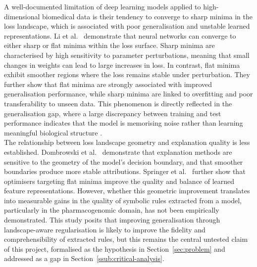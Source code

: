 \label{ssub:sam}

A well-documented limitation of deep learning models applied to high-dimensional biomedical data is
their tendency to converge to sharp minima in the loss landscape, which is associated with poor
generalisation and unstable learned representations. Li et al.~\cite{Li2018} demonstrate that neural
networks can converge to either sharp or flat minima within the loss surface. Sharp minima are
characterised by high sensitivity to parameter perturbations, meaning that small changes in weights can
lead to large increases in loss. In contrast, flat minima exhibit smoother regions where the loss
remains stable under perturbation. They further show that flat minima are strongly associated with
improved generalisation performance, while sharp minima are linked to overfitting and poor
transferability to unseen data. This phenomenon is directly reflected in the generalisation gap, where
a large discrepancy between training and test performance indicates that the model is memorising noise
rather than learning meaningful biological structure \cite{Keskar2016}.
\\
The relationship between loss landscape geometry and explanation quality is less established.
Dombrowski et al.~\cite{Dombrowski2022} demonstrate that explanation methods are sensitive to the
geometry of the model's decision boundary, and that smoother boundaries produce more stable
attributions. Springer et al.~\cite{Springer2024} further show that optimisers targeting flat minima
improve the quality and balance of learned feature representations. However, whether this geometric
improvement translates into measurable gains in the quality of symbolic rules extracted from a model,
particularly in the pharmacogenomic domain, has not been empirically demonstrated. This study posits
that improving generalisation through landscape-aware regularisation is likely to improve the fidelity
and comprehensibility of extracted rules, but this remains the central untested claim of this project,
formalised as the hypothesis in Section~\ref{sec:problem} and addressed as a gap in
Section~\ref{ssub:critical-analysis}.


